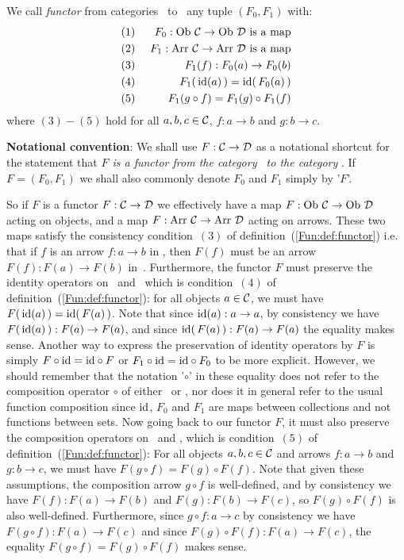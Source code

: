 \begin{defin}\label{Fun:def:functor}
    We call {\em functor} from categories \Cat\ to \Dat\ any tuple 
    $(F_{0},F_{1})$ with:
        \begin{eqnarray*}
            (1)&\ &F_{0}:\mbox{\rm Ob}\ \mbox{$\cal C$}\to\mbox{\rm Ob}\ \mbox{$\cal D$}\mbox{\ is a map}\\
            (2)&\ &F_{1}:\mbox{\rm Arr}\ \mbox{$\cal C$}\to\mbox{\rm Arr}\ \mbox{$\cal D$}\mbox{\ is a map}\\
            (3)&\ &F_{1}(f):F_{0}(a)\to F_{0}(b)\\
            (4)&\ &F_{1}(\,\mbox{\rm id}(a)\,)=\mbox{\rm id}(\,F_{0}(a)\,)\\
            (5)&\ &F_{1}(g\circ f)=F_{1}(g)\circ F_{1}(f)
    \end{eqnarray*}
    where $(3)-(5)$ hold for all $a,b,c\in\mbox{$\cal C$}$, $f:a\to b$ and $g:b\to c$.
\end{defin}
\noindent
{\bf Notational convention}: We shall use $F:\mbox{$\cal C$}\to\mbox{$\cal D$}$ as a notational 
shortcut for the statement that {\em $F$ is a functor from the category
\Cat\ to the category \Dat}. If $F=(F_{0},F_{1})$ we shall also commonly 
denote $F_{0}$ and $F_{1}$ simply by '$F$'.

So if $F$ is a functor $F:\mbox{$\cal C$}\to\mbox{$\cal D$}$ we effectively have a map 
$F:\ob\ \Cat\to\ob\ \Dat$ acting on objects, and a map 
$F:\mbox{\rm Arr}\ \mbox{$\cal C$}\to\mbox{\rm Arr}\ \mbox{$\cal D$}$ acting on arrows. These two maps 
satisfy the consistency condition~$(3)$ of definition~(\ref{Fun:def:functor})
i.e. that if $f$ is an arrow $f:a\to b$ in \Cat, then $F(f)$ must be 
an arrow $F(f):F(a)\to F(b)$ in~\Dat. Furthermore, the functor
$F$ must preserve the identity operators on \Cat\ and \Dat\ which
is condition~$(4)$ of definition~(\ref{Fun:def:functor}): for all objects
$a\in\mbox{$\cal C$}$, we must have $F(\,\mbox{\rm id}(a)\,)=\mbox{\rm id}(\,F(a)\,)$. Note that since
$\mbox{\rm id}(a):a\to a$, by consistency we have $F(\,\mbox{\rm id}(a)\,):F(a)\to F(a)$,
and since $\mbox{\rm id}(\,F(a)\,):F(a)\to F(a)$ the equality makes sense.
Another way to express the preservation of identity operators by $F$
is simply $F\circ\mbox{\rm id}=\mbox{\rm id}\circ F$ or $F_{1}\circ\mbox{\rm id}=\mbox{\rm id}\circ F_{0}$ to 
be more explicit. However, we should remember that the notation '$\circ$'
in these equality does not refer to the composition operator $\circ$
of either \Cat\ or \Dat, nor does it in general refer to the usual
function composition since $\mbox{\rm id}$, $F_{0}$ and $F_{1}$ are maps between 
collections and not functions between sets. Now going back to our
functor $F$, it must also preserve the composition operators on
\Cat\ and \Dat, which is condition~$(5)$ of definition~(\ref{Fun:def:functor}):
For all objects $a,b,c\in\mbox{$\cal C$}$ and arrows $f:a\to b$ and $g:b\to c$, 
we must have $F(g\circ f)=F(g)\circ F(f)$. Note that given these 
assumptions, the composition arrow $g\circ f$ is well-defined,
and by consistency we have $F(f):F(a)\to F(b)$ and $F(g):F(b)\to F(c)$,
so $F(g)\circ F(f)$ is also well-defined. Furthermore, since
$g\circ f:a \to c$ by consistency we have $F(g\circ f):F(a)\to F(c)$
and since $F(g)\circ F(f):F(a)\to F(c)$, the equality 
$F(g\circ f)=F(g)\circ F(f)$ makes sense.
